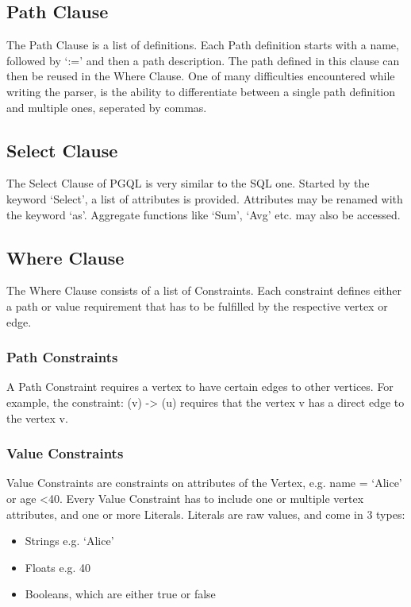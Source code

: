 \documentclass[11pt,singlecolumn]{scrartcl}
\begin{document}
\subsection{Path Clause}

The Path Clause is a list of definitions. Each Path definition starts with a name, followed by `:=' and then a path description. The path defined in this clause can then be reused in the Where Clause. One of many difficulties encountered while writing the parser, is the ability to differentiate between a single path definition and multiple ones, seperated by commas.


\clearpage
\subsection{Select Clause}
The Select Clause of PGQL is very similar to the SQL one. Started by the keyword `Select', a list of attributes is provided. Attributes may be renamed with the keyword `as'. Aggregate functions like `Sum', `Avg' etc. may also be accessed.

\clearpage

\subsection{Where Clause}
The Where Clause consists of a list of Constraints. Each constraint defines either a path or value requirement that has to be fulfilled by the respective vertex or edge.
 
 \subsubsection{Path Constraints}
 A Path Constraint requires a vertex to have certain edges to other vertices. For example, the constraint: (v) -> (u) requires that the vertex v has a direct edge to the vertex v.
 
 \subsubsection{Value Constraints}
 Value Constraints are constraints on attributes of the Vertex, e.g. name = `Alice' or age \textless  40. Every Value Constraint has to include one or multiple vertex attributes, and one or more Literals. Literals are raw values, and come in 3 types:
 \begin{itemize} 
\item Strings e.g. `Alice'
\item Floats e.g. 40
\item Booleans, which are either true or false
\end{itemize}
 
\end{document}
